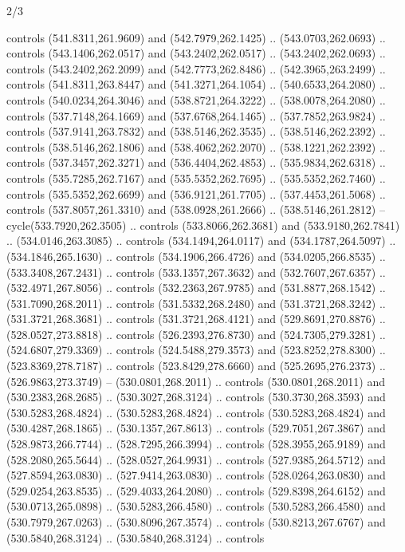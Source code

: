 \begin{flagdescription}{2/3}
\begin{scope}[xshift=0.5\flaglength,yshift=0.5\flagwidth,scale=\flagwidth/495.65]
\begin{scope}[y=0.8pt, x=0.8pt, yscale=-1,shift={(-463.76,-309.78)}]
  controls (541.8311,261.9609) and (542.7979,262.1425) .. (543.0703,262.0693) ..
  controls (543.1406,262.0517) and (543.2402,262.0517) .. (543.2402,262.0693) ..
  controls (543.2402,262.2099) and (542.7773,262.8486) .. (542.3965,263.2499) ..
  controls (541.8311,263.8447) and (541.3271,264.1054) .. (540.6533,264.2080) ..
  controls (540.0234,264.3046) and (538.8721,264.3222) .. (538.0078,264.2080) ..
  controls (537.7148,264.1669) and (537.6768,264.1465) .. (537.7852,263.9824) ..
  controls (537.9141,263.7832) and (538.5146,262.3535) .. (538.5146,262.2392) ..
  controls (538.5146,262.1806) and (538.4062,262.2070) .. (538.1221,262.2392) ..
  controls (537.3457,262.3271) and (536.4404,262.4853) .. (535.9834,262.6318) ..
  controls (535.7285,262.7167) and (535.5352,262.7695) .. (535.5352,262.7460) ..
  controls (535.5352,262.6699) and (536.9121,261.7705) .. (537.4453,261.5068) ..
  controls (537.8057,261.3310) and (538.0928,261.2666) .. (538.5146,261.2812) --
  cycle(533.7920,262.3505) .. controls (533.8066,262.3681) and
  (533.9180,262.7841) .. (534.0146,263.3085) .. controls (534.1494,264.0117) and
  (534.1787,264.5097) .. (534.1846,265.1630) .. controls (534.1906,266.4726) and
  (534.0205,266.8535) .. (533.3408,267.2431) .. controls (533.1357,267.3632) and
  (532.7607,267.6357) .. (532.4971,267.8056) .. controls (532.2363,267.9785) and
  (531.8877,268.1542) .. (531.7090,268.2011) .. controls (531.5332,268.2480) and
  (531.3721,268.3242) .. (531.3721,268.3681) .. controls (531.3721,268.4121) and
  (529.8691,270.8876) .. (528.0527,273.8818) .. controls (526.2393,276.8730) and
  (524.7305,279.3281) .. (524.6807,279.3369) .. controls (524.5488,279.3573) and
  (523.8252,278.8300) .. (523.8369,278.7187) .. controls (523.8429,278.6660) and
  (525.2695,276.2373) .. (526.9863,273.3749) -- (530.0801,268.2011) .. controls
  (530.0801,268.2011) and (530.2383,268.2685) .. (530.3027,268.3124) .. controls
  (530.3730,268.3593) and (530.5283,268.4824) .. (530.5283,268.4824) .. controls
  (530.5283,268.4824) and (530.4287,268.1865) .. (530.1357,267.8613) .. controls
  (529.7051,267.3867) and (528.9873,266.7744) .. (528.7295,266.3994) .. controls
  (528.3955,265.9189) and (528.2080,265.5644) .. (528.0527,264.9931) .. controls
  (527.9385,264.5712) and (527.8594,263.0830) .. (527.9414,263.0830) .. controls
  (528.0264,263.0830) and (529.0254,263.8535) .. (529.4033,264.2080) .. controls
  (529.8398,264.6152) and (530.0713,265.0898) .. (530.5283,266.4580) .. controls
  (530.5283,266.4580) and (530.7979,267.0263) .. (530.8096,267.3574) .. controls
  (530.8213,267.6767) and (530.5840,268.3124) .. (530.5840,268.3124) .. controls

\end{scope}
\end{scope}
\end{flagdescription}
